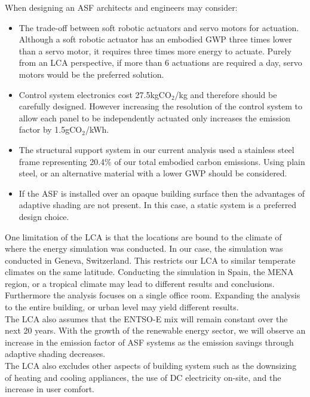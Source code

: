 When designing an ASF architects and engineers may consider: 
\begin{itemize}
\item The trade-off between soft robotic actuators and servo motors for actuation. Although a soft robotic actuator has an embodied GWP three times lower than a servo motor, it requires three times more energy to actuate. Purely from an LCA perspective, if more than 6 actuations are required a day, servo motors would be the preferred solution. 
\item Control system electronics cost 27.5kgCO${_2}$/kg and therefore should be carefully designed. However increasing the resolution of the control system to allow each panel to be independently actuated only increases the emission factor by 1.5gCO${_2}$/kWh.
\item The structural support system in our current analysis used a stainless steel frame representing 20.4\% of our total embodied carbon emissions. Using plain steel, or an alternative material with a lower GWP should be considered.
\item If the ASF is installed over an opaque building surface then the advantages of adaptive shading are not present. In this case, a static system is a preferred design choice. 
\end{itemize}

One limitation of the LCA is that the locations are bound to the climate of where the energy simulation was conducted. In our case, the simulation was conducted in Geneva, Switzerland. This restricts our LCA to similar temperate climates on the same latitude. Conducting the simulation in Spain, the MENA region, or a tropical climate may lead to different results and conclusions. Furthermore the analysis focuses on a single office room. Expanding the analysis to the entire building, or urban level may yield different results.\\
The LCA also assumes that the ENTSO-E mix will remain constant over the next 20 years. With the growth of the renewable energy sector, we will observe an increase in the emission factor of ASF systems as the emission savings through adaptive shading decreases. \\
The LCA also excludes other aspects of building system such as the downsizing of heating and cooling appliances, the use of DC electricity on-site, and the increase in user comfort. 


